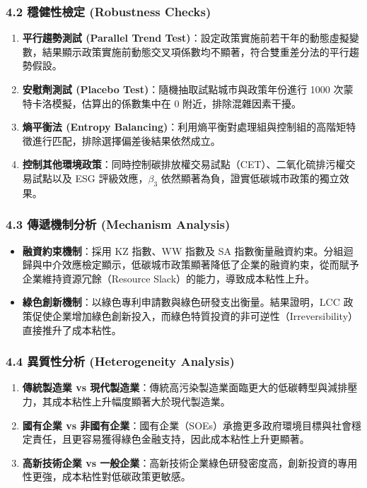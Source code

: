 \documentclass[11pt,a4paper]{article}
\begin{document}
\subsubsection{4.2 穩健性檢定 (Robustness Checks)}
\begin{enumerate}[leftmargin=2em]
    \item \textbf{平行趨勢測試 (Parallel Trend Test)}：設定政策實施前若干年的動態虛擬變數，結果顯示政策實施前動態交叉項係數均不顯著，符合雙重差分法的平行趨勢假設。
    \item \textbf{安慰劑測試 (Placebo Test)}：隨機抽取試點城市與政策年份進行 1000 次蒙特卡洛模擬，估算出的係數集中在 0 附近，排除混雜因素干擾。
    \item \textbf{熵平衡法 (Entropy Balancing)}：利用熵平衡對處理組與控制組的高階矩特徵進行匹配，排除選擇偏差後結果依然成立。
    \item \textbf{控制其他環境政策}：同時控制碳排放權交易試點（CET）、二氧化硫排污權交易試點以及 ESG 評級效應，$\beta_3$ 依然顯著為負，證實低碳城市政策的獨立效果。
\end{enumerate}

\subsubsection{4.3 傳遞機制分析 (Mechanism Analysis)}
\begin{itemize}[leftmargin=2em]
    \item \textbf{融資約束機制}：採用 KZ 指數、WW 指數及 SA 指數衡量融資約束。分組迴歸與中介效應檢定顯示，低碳城市政策顯著降低了企業的融資約束，從而賦予企業維持資源冗餘（Resource Slack）的能力，導致成本粘性上升。
    \item \textbf{綠色創新機制}：以綠色專利申請數與綠色研發支出衡量。結果證明，LCC 政策促使企業增加綠色創新投入，而綠色特質投資的非可逆性（Irreversibility）直接推升了成本粘性。
\end{itemize}

\subsubsection{4.4 異質性分析 (Heterogeneity Analysis)}
\begin{enumerate}[leftmargin=2em]
    \item \textbf{傳統製造業 vs 現代製造業}：傳統高污染製造業面臨更大的低碳轉型與減排壓力，其成本粘性上升幅度顯著大於現代製造業。
    \item \textbf{國有企業 vs 非國有企業}：國有企業（SOEs）承擔更多政府環境目標與社會穩定責任，且更容易獲得綠色金融支持，因此成本粘性上升更顯著。
    \item \textbf{高新技術企業 vs 一般企業}：高新技術企業綠色研發密度高，創新投資的專用性更強，成本粘性對低碳政策更敏感。
\end{enumerate}
\end{document}
